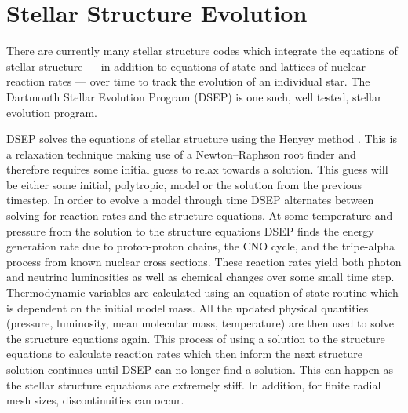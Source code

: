 \chapter{Stellar Structure Evolution}
There are currently many stellar structure codes \citep[e.g.][]{Dotter2008,
Kovetz2009, Paxton2011} which integrate the equations of stellar structure ---
in addition to equations of state and lattices of nuclear reaction rates ---
over time to track the evolution of an individual star. The Dartmouth Stellar
Evolution Program (DSEP) \citep{Chaboyer2001, Bjork2006, Dotter2008} is one
such, well tested, stellar evolution program.

DSEP solves the equations of stellar structure using the Henyey method
\citep{Henyey1964}. This is a relaxation technique making use of a
Newton–Raphson root finder and therefore requires some initial guess to relax
towards a solution. This guess will be either some initial, polytropic, model
or the solution from the previous timestep.  In order to evolve a model through
time DSEP alternates between solving for reaction rates and the structure
equations. At some temperature and pressure from the solution to the structure
equations DSEP finds the energy generation rate due to proton-proton chains,
the CNO cycle, and the tripe-alpha process from known nuclear cross sections.
These reaction rates yield both photon and neutrino luminosities as well as
chemical changes over some small time step. Thermodynamic variables are
calculated using an equation of state routine which is dependent on the initial
model mass. All the updated physical quantities (pressure, luminosity, mean
molecular mass, temperature) are then used to solve the structure equations
again. This process of using a solution to the structure equations to calculate
reaction rates which then inform the next structure solution continues until
DSEP can no longer find a solution.  This can happen as the stellar structure
equations are extremely stiff. In addition, for finite radial mesh sizes,
discontinuities can occur.

